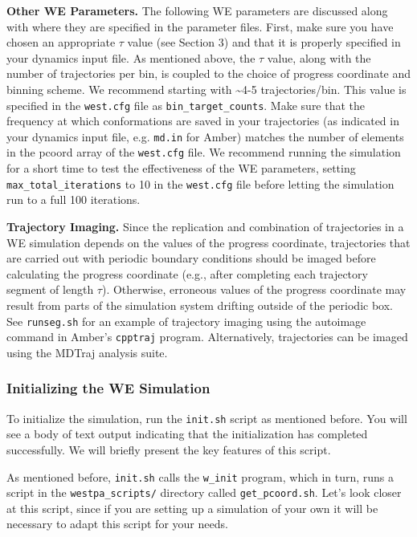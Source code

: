 \documentclass[9pt,tutorial]{livecoms}
\begin{document}
\textbf{Other WE Parameters.} The following WE parameters are discussed along with where they are specified in the parameter files. 
First, make sure you have chosen an  appropriate $\tau$ value (see Section 3) and that it is properly specified in your dynamics input file. 
As mentioned above, the $\tau$ value, along with the number of trajectories per bin, is coupled to the choice of progress coordinate and binning scheme. 
We recommend starting with \textasciitilde 4-5 trajectories/bin. 
This value is specified in the \verb|west.cfg| file as \verb|bin_target_counts|. 
Make sure that the frequency at which conformations are saved in your trajectories (as indicated in your dynamics input file, e.g. \verb|md.in| for Amber) matches the number of elements in the pcoord array of the \verb|west.cfg| file. 
We recommend running the simulation for a short time to test the effectiveness of the WE parameters, setting \verb|max_total_iterations| to 10 in the \verb|west.cfg| file before letting the simulation run to a full 100 iterations.  

\textbf{Trajectory Imaging.} Since the replication and combination of trajectories in a WE simulation depends on the values of the progress coordinate, trajectories that are carried out with periodic boundary conditions should be imaged before calculating the progress coordinate (e.g., after completing each trajectory segment of length $\tau$). 
Otherwise, erroneous values of the progress coordinate may result from parts of the simulation system drifting outside of the periodic box. 
See \verb|runseg.sh| for an example of trajectory imaging using the autoimage command in Amber’s \verb|cpptraj| program. 
Alternatively, trajectories can be imaged using the MDTraj analysis suite. 

\subsubsection{Initializing the WE Simulation}

To initialize the simulation, run the \verb|init.sh| script as mentioned before. 
You will see a body of text output indicating that the initialization has completed successfully. 
We will briefly present the key features of this script. 

As mentioned before, \verb|init.sh| calls the \verb|w_init| program, which in turn, runs a script in the \verb|westpa_scripts/| directory called \verb|get_pcoord.sh|. 
Let’s look closer at this script, since if you are setting up a simulation of your own it will be necessary to adapt this script for your needs.
\end{document}
